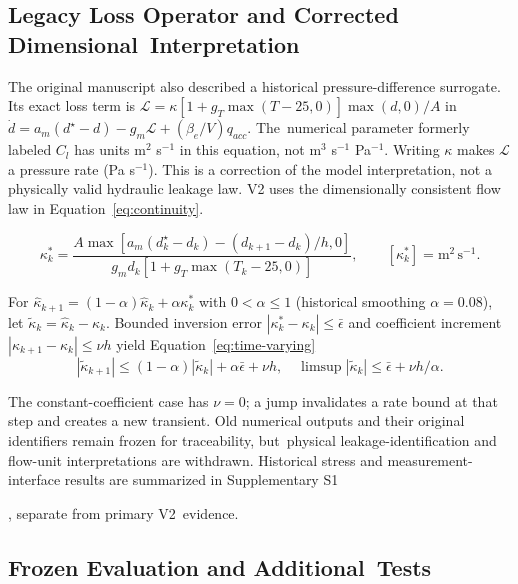 \documentclass[machines,article,submit,pdftex,moreauthors]{Definitions/mdpi}
\begin{document}
\subsection{Legacy Loss Operator and Corrected Dimensional~Interpretation}
The original manuscript also described a historical pressure-difference surrogate. Its exact loss term is $\mathcal L=\kappa[1+g_T\max(T-25,0)]\max(d,0)/A$ in $\dot d=a_m(d^\star-d)-g_m\mathcal L+(\beta_e/V)q_{acc}$. The~numerical parameter formerly labeled $C_l$ has units m$^2$ s$^{-1}$ in this equation, not m$^3$ s$^{-1}$ Pa$^{-1}$. Writing $\kappa$ makes $\mathcal L$ a pressure rate (Pa s$^{-1}$). This is a correction of the model interpretation, not a physically valid hydraulic leakage law. V2 uses the dimensionally consistent flow law in Equation~\eqref{eq:continuity}.

\begin{equation}
\kappa_k^*=\frac{A\max[a_m(d_k^\star-d_k)-(d_{k+1}-d_k)/h,0]}{g_md_k[1+g_T\max(T_k-25,0)]},\qquad [\kappa_k^*]=\mathrm{m^2\,s^{-1}}.
\label{eq:legacy-proxy}
\end{equation}

For $\hat\kappa_{k+1}=(1-\alpha)\hat\kappa_k+\alpha\kappa_k^*$ with $0<\alpha\le1$ (historical smoothing $\alpha=0.08$), let $\widetilde\kappa_k=\hat\kappa_k-\kappa_k$. Bounded inversion error $|\kappa_k^*-\kappa_k|\le\bar\epsilon$ and coefficient increment $|\kappa_{k+1}-\kappa_k|\le\nu h$ yield Equation~\eqref{eq:time-varying}
\begin{equation}
|\widetilde\kappa_{k+1}|\le(1-\alpha)|\widetilde\kappa_k|+\alpha\bar\epsilon+\nu h,
\quad \limsup|\widetilde\kappa_k|\le\bar\epsilon+\nu h/\alpha.
\label{eq:time-varying}
\end{equation}

The constant-coefficient case has $\nu=0$; a jump invalidates a rate bound at that step and creates a new transient. Old numerical outputs and their original identifiers remain frozen for traceability, but~physical leakage-identification and flow-unit interpretations are withdrawn. Historical stress and measurement-interface results are summarized in Supplementary S1

, separate from primary V2~evidence.

\subsection{Frozen Evaluation and Additional~Tests}
\label{sec3.6}
\end{document}
